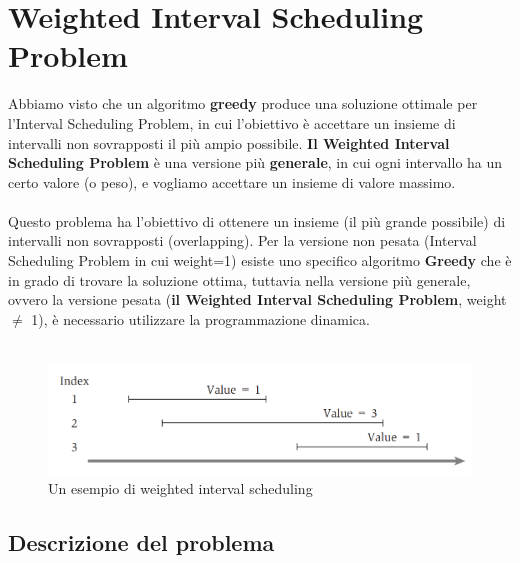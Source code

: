 \chapter{Weighted Interval Scheduling
  Problem}

Abbiamo visto che un algoritmo \textbf{greedy} produce una soluzione
ottimale per l'Interval Scheduling Problem, in cui l'obiettivo è
accettare un insieme di intervalli non sovrapposti il più ampio
possibile. \textbf{Il Weighted Interval Scheduling Problem} è una
versione più \textbf{generale}, in cui ogni intervallo ha un certo
valore (o peso), e vogliamo accettare un insieme di valore massimo.
\\
\\
Questo problema ha l'obiettivo di ottenere un insieme (il più grande
possibile) di intervalli non sovrapposti (overlapping). Per la versione
non pesata (Interval Scheduling Problem in cui weight=1) esiste uno
specifico algoritmo \textbf{Greedy} che è in grado di trovare la
soluzione ottima, tuttavia nella versione più generale, ovvero la
versione pesata (\textbf{il Weighted Interval Scheduling Problem},
weight $\neq$ 1), è necessario utilizzare la programmazione dinamica.
\\
\\


\begin{figure}[H]
  \includegraphics[width=\textwidth]{Programmazione_dinamica/imgs/weigted_interval_scheduling.png}
  \centering
  \caption{Un esempio di weighted interval scheduling}
  \label{fig:wis}
\end{figure}


\section{Descrizione del problema}

